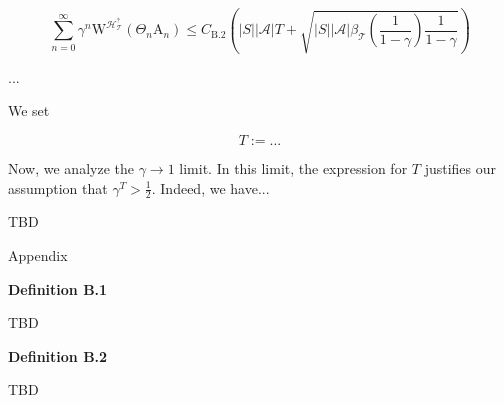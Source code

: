 \documentclass[a4paper]{article}
\newcommand{\Co}[1]{}
\newcommand{\AP}[1]{\left(#1\right)}
\newcommand{\Abs}[1]{\left\vert #1 \right\vert}
\newcommand{\A}{\mathcal{A}}
\newcommand{\T}{\mathcal{T}}
\newcommand{\Hy}{\mathcal{H}}
\newcommand{\AT}{\mathrm{A}}
\newcommand{\W}{\mathrm{W}}
\begin{document}
$$\sum_{n=0}^\infty\gamma^{n}\W^{\Hy_\T^{?}}\AP{\Theta_{n}\AT_n}\leq C_{\text{B.2}}\AP{\Abs{S}\Abs{\A} T+\sqrt{\Abs{S}\Abs{\A}\beta_\T\AP{\frac{1}{1-\gamma}}\frac{1}{1-\gamma}}}$$

...

We set

$$T:=...$$

Now, we analyze the $\gamma\rightarrow1$ limit. In this limit, the expression for $T$ justifies our assumption that $\gamma^T>\frac{1}{2}$. Indeed, we have...

TBD

\begin{Huge}Appendix\end{Huge}

\textbf{Definition B.1}\Co{b}

TBD %

\textbf{Definition B.2}\Co{b}

TBD %
\end{document}
